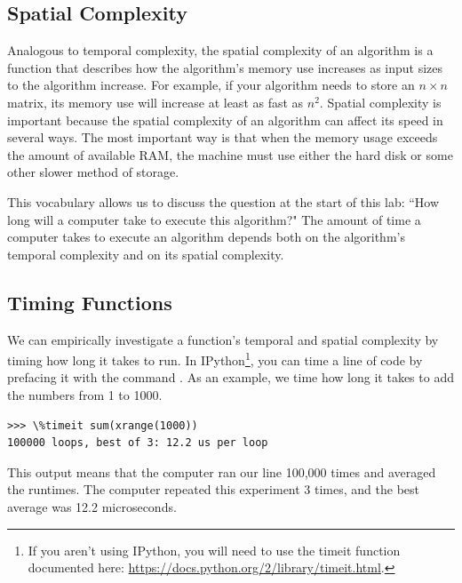 \subsection*{Spatial Complexity}
Analogous to temporal complexity, the spatial complexity of an algorithm is a function that describes how the algorithm's memory use increases as input sizes to the algorithm increase. For example, if your algorithm needs to store an $n \times n$ matrix, its memory use will increase at least as fast as $n^2$. Spatial complexity is important because  the spatial complexity of an algorithm can affect its speed in several ways. The most important way is that when the memory usage exceeds the amount of available RAM, the machine must use either the hard disk or some other slower method of storage.

This vocabulary allows us to discuss the question at the start of this lab: ``How long will a computer take to execute this algorithm?" The amount of time a computer takes to execute an algorithm depends both on the algorithm's temporal complexity and on its spatial complexity. 

\subsection*{Timing Functions}
We can empirically investigate a function's temporal and spatial complexity by timing how long it takes to run.
In IPython\footnote{If you aren't using IPython, you will need
to use the timeit function documented here: \url{https://docs.python.org/2/library/timeit.html}.}, you can time a line of code by prefacing it with the command .
As an example, we time how long it takes to add the numbers from 1 to 1000.
\begin{lstlisting}
>>> \%timeit sum(xrange(1000))
100000 loops, best of 3: 12.2 us per loop
\end{lstlisting}
This output means that the computer ran our line 100,000 times and averaged the runtimes.
The computer repeated this experiment 3 times, and the best average was 12.2 microseconds.


